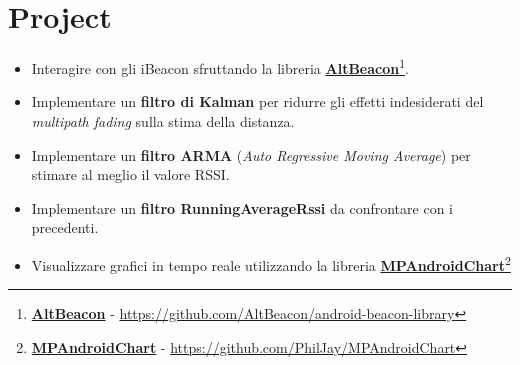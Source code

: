\chapter{Project}

\begin{itemize}
		
	
	\item Interagire con gli iBeacon sfruttando la libreria \href{https://github.com/AltBeacon/android-beacon-library}{\textbf{AltBeacon}}\footnote{\href{https://github.com/AltBeacon/android-beacon-library}{\textbf{AltBeacon}} - \url{https://github.com/AltBeacon/android-beacon-library}}.
	
	\item Implementare un \textbf{filtro di Kalman} per ridurre gli effetti indesiderati del \textit{multipath fading} sulla stima della distanza.
	
	\item Implementare un \textbf{filtro ARMA} (\textit{Auto Regressive Moving Average}) per stimare al meglio il valore RSSI.
	
	\item Implementare un \textbf{filtro RunningAverageRssi} da confrontare con i precedenti.
	
	\item Visualizzare grafici in tempo reale utilizzando la libreria \href{https://github.com/PhilJay/MPAndroidChart}{\textbf{MPAndroidChart}}\footnote{\href{https://github.com/PhilJay/MPAndroidChart}{\textbf{MPAndroidChart}} - \url{https://github.com/PhilJay/MPAndroidChart}}

	
\end{itemize}



